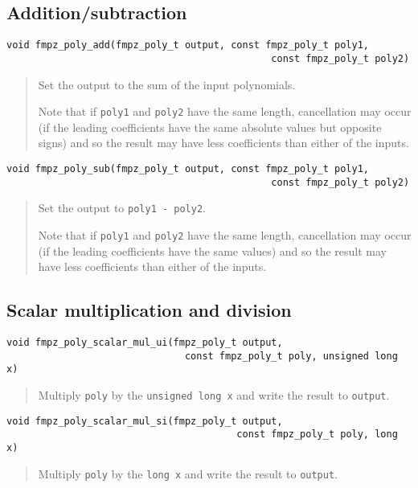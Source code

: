 \documentclass[a4paper,10pt]{article}
\newcommand{\code}{\lstinline}
\begin{document}
\subsection{Addition/subtraction}


\begin{lstlisting}
void fmpz_poly_add(fmpz_poly_t output, const fmpz_poly_t poly1, 
                                              const fmpz_poly_t poly2) 
\end{lstlisting}
\begin{quote}
Set the output to the sum of the input polynomials. 

Note that if \code{poly1} and \code{poly2} have the same length, cancellation may occur (if the leading coefficients have the same absolute values but opposite signs) and so the result may have less coefficients than either of the inputs. 
\end{quote}

\begin{lstlisting}
void fmpz_poly_sub(fmpz_poly_t output, const fmpz_poly_t poly1, 
                                              const fmpz_poly_t poly2) 
\end{lstlisting}
\begin{quote}
Set the output to \code{poly1 - poly2}. 

Note that if \code{poly1} and \code{poly2} have the same length, cancellation may occur (if the leading coefficients have the same values) and so the result may have less coefficients than either of the inputs. 
\end{quote}

\subsection{Scalar multiplication and division}

\begin{lstlisting}
void fmpz_poly_scalar_mul_ui(fmpz_poly_t output, 
                               const fmpz_poly_t poly, unsigned long x)
\end{lstlisting}
\begin{quote}
Multiply \code{poly} by the \code{unsigned long x} and write the result to \code{output}. 
\end{quote}

\begin{lstlisting}
void fmpz_poly_scalar_mul_si(fmpz_poly_t output, 
                                        const fmpz_poly_t poly, long x)
\end{lstlisting}
\begin{quote}
Multiply \code{poly} by the \code{long x} and write the result to \code{output}. 
\end{quote}
\end{document}
